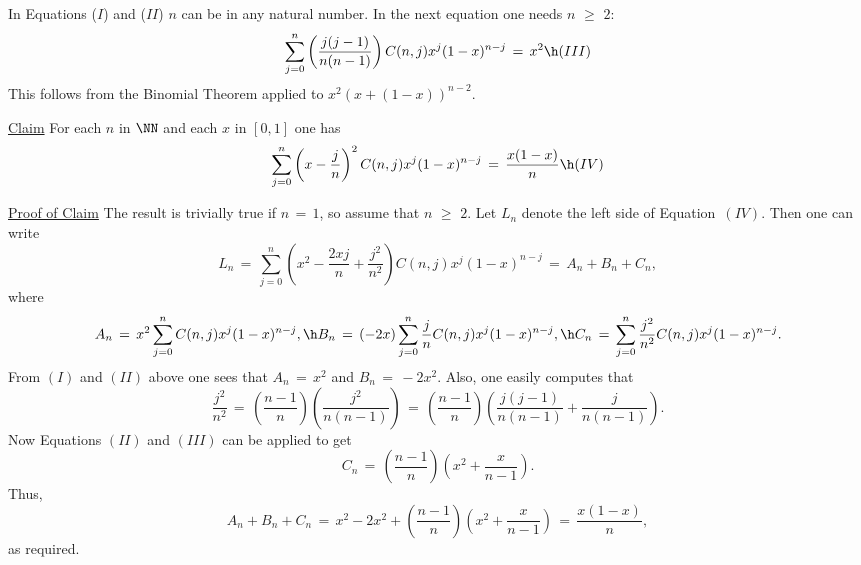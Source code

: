         In Equations ($I$) and ($II$) $n$ can be in any natural number. In the next equation one needs $n\,\,{\geq}\,\,2$:
        \begin{displaymath}
        \sum_{j=0}^{n} \left(\frac{j(j-1)}{n(n-1)}\right)C(n,j)x^{j}(1-x)^{n-j} \,=\, x^{2} \h (III)
        \end{displaymath}
    This follows from the Binomial Theorem applied to $x^{2}(x+(1-x))^{n-2}$.

        \underline{Claim} For each $n$ in ${\NN}$ and each $x$ in $[0,1]$ one has
        \begin{displaymath}
        \sum_{j=0}^{n} \left(x - \frac{j}{n}\right)^{2}C(n,j)x^{j}(1-x)^{n-j} \,=\, \frac{x(1-x)}{n} \h (IV)
        \end{displaymath}

        \underline{Proof of Claim} The result is trivially true if $n \,=\, 1$, so assume that $n\,\,{\geq}\,\,2$.
    Let $L_{n}$ denote the left side of Equation~$(IV)$. Then one can write
        \begin{displaymath}
        L_{n} \,=\, \sum_{j=0}^{n} \left(x^{2} - \frac{2xj}{n} + \frac{j^{2}}{n^{2}}\right)C(n,j)x^{j}(1-x)^{n-j} \,=\, A_{n} + B_{n} + C_{n},
        \end{displaymath}
    where
        \begin{displaymath}
        A_{n} \,=\, x^{2}\sum_{j=0}^{n} C(n,j)x^{j}(1-x)^{n-j}, \h
        B_{n} \,=\, (-2x)\sum_{j=0}^{n} \frac{j}{n}C(n,j)x^{j}(1-x)^{n-j}, \h
        C_{n} \,=\, \sum_{j=0}^{n} \frac{j^{2}}{n^{2}}C(n,j)x^{j}(1-x)^{n-j}.
        \end{displaymath}
    From $(I)$ and $(II)$ above one sees that $A_{n} \,=\, x^{2}$ and $B_{n} \,=\, -2x^{2}$.
    Also, one easily computes that
        \begin{displaymath}
        \frac{j^{2}}{n^{2}} \,=\, \left(\frac{n-1}{n}\right)\left(\frac{j^{2}}{n(n-1)}\right) \,=\, 
    \left(\frac{n-1}{n}\right)\left(\frac{j(j-1)}{n(n-1)} + \frac{j}{n(n-1)}\right).
        \end{displaymath}
    Now Equations $(II)$ and $(III)$ can be applied to get
        \begin{displaymath}
        C_{n} \,=\, \left(\frac{n-1}{n}\right)\left(x^{2} + \frac{x}{n-1}\right).
        \end{displaymath}
    Thus,
        \begin{displaymath}
        A_{n} + B_{n} + C_{n} \,=\, x^{2} - 2x^{2} + \left(\frac{n-1}{n}\right)\left(x^{2} + \frac{x}{n-1}\right) \,=\, \frac{x(1-x)}{n},
        \end{displaymath}
    as required.

